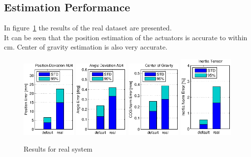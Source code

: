 \subsection{Estimation Performance}
In figure~\ref{fig:err_cmp_real} the results of the real dataset are presented.\\
It can be seen that the position estimation of the actuators is accurate to within \unit[2]{cm}.
Center of gravity estimation is also very accurate.

\begin{figure}[hbtp]
\centering
\includegraphics[width=0.24\textwidth]{images/results/err_cmp_real_pos.eps}
\includegraphics[width=0.24\textwidth]{images/results/err_cmp_real_angle.eps}
\includegraphics[width=0.24\textwidth]{images/results/err_cmp_real_cog.eps}
\includegraphics[width=0.24\textwidth]{images/results/err_cmp_real_tensor.eps}
\caption{Results for real system}
\label{fig:err_cmp_real}
\end{figure}

